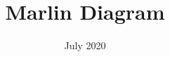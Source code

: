 \documentclass{article}
\title{Marlin Diagram}
\date{July 2020}
\begin{document}
\newcommand{\cm}[1]{\ensuremath{\mathsf{cm}_{#1}}}
\newcommand{\vcm}[1]{\ensuremath{\mathsf{vcm}_{#1}}}
\newcommand{\s}{\ensuremath{\hat{s}}}
\newcommand{\w}{\ensuremath{\hat{w}}}
\newcommand{\z}{\ensuremath{\hat{z}}}
\newcommand{\za}{\ensuremath{\hat{z}_A}}
\newcommand{\zb}{\ensuremath{\hat{z}_B}}
\newcommand{\zc}{\ensuremath{\hat{z}_C
}}
\newcommand{\zm}{\ensuremath{\hat{z}_M}}

\newcommand{\val}{\ensuremath{\mathsf{val}}}
\newcommand{\row}{\ensuremath{\mathsf{row}}}
\newcommand{\col}{\ensuremath{\mathsf{col}}}
\newcommand{\rowcol}{\ensuremath{\mathsf{rowcol}}}

\newcommand{\hval}{\ensuremath{\hat{\val}}}
\newcommand{\hrow}{\ensuremath{\hat{\row}}}
\newcommand{\hcol}{\ensuremath{\hat{\col}}}
\newcommand{\hrowcol}{\ensuremath{\hat{\rowcol}}}

\newcommand{\bb}{\ensuremath{\mathsf{b}}}
\newcommand{\denom}{\ensuremath{\mathsf{denom}}}

\newcommand{\sumcheckinner}{\mathsf{sumcheck}
_{\mathsf{inner}}}
\newcommand{\sumcheckouter}{\mathsf{sumcheck}_{\mathsf{outer}}}

\newcommand{\Prover}{\mathcal{P}}
\newcommand{\Verifier}{\mathcal{V}}

\newcommand{\F}{\mathbb{F}}

\newcommand{\DomainA}{H}
\newcommand{\DomainB}{K}

\newcommand{\vPoly}[1]{\ensuremath{v_{#1}}}
\end{document}

